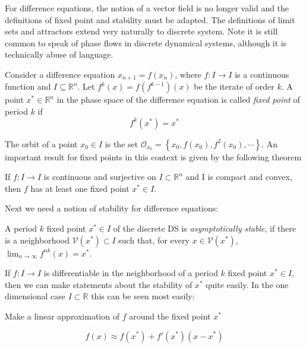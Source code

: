 For difference equations, the notion of a vector field is no longer valid and the definitions of fixed point and stability must be adapted. The definitions of
limit sets and attractors extend very naturally to discrete system.
Note it is still common to speak of phase flows in discrete dynamical systems, although it is technically abuse of language.

\begin{definition}
    Consider a difference equation $x_{n+1} = f(x_n)$, where $f: I \rightarrow I$ is a continuous function and $I \subseteq \mathbb{R}^n$.
    Let $f^k(x) = f(f^{k-1})(x)$ be the iterate of order $k$. A point $x^{\ast}\in \mathbb{R}^n$ in the phase space of the difference equation 
    is called \textit{fixed point} of period $k$ if 
    \begin{equation}
        f^k(x^{\ast}) = x^{\ast}
        \label{eq:dicr_fp}
    \end{equation}
\end{definition}

The orbit of a point $x_0 \in I$ is the set $\mathscr{O}_{x_0} = \left\{x_0, f(x_0), f^2(x_0), \cdots \right\}$. An important result for fixed points in this context is 
given by the following theorem

\begin{theorem}
If $f:I \rightarrow I$ is continuous and surjective on $I \subset \mathbb{R}^n$ and I is compact and convex, then $f$ has at least one fixed point $x^{\ast} \in I$.
\end{theorem}

Next we need a notion of stability for difference equations: 

\begin{definition}
    A period $k$ fixed point $x^{\ast} \in I$ of the discrete DS is \textit{asymptotically stable}, if there is a neighborhood $\mathcal{V}(x^{\ast}) \subset I$ such that,
    for every $x \in \mathcal{V}(x^{\ast})$, $\lim_{n\rightarrow \infty}f^{nk}(x) = x^{\ast}$.
\end{definition}

If $f: I \rightarrow I$ is differentiable in the neighborhood of a period $k$ fixed point $x^{\ast} \in I$, then we can make statements about the stability of $x^{\ast}$
quite easily. In the one dimensional case $I \subset \mathbb{R}$ this can be seen most easily:

Make a linear approximation of $f$ around the fixed point $x^{\ast}$

\begin{equation}
    f(x) \approx f(x^{\ast}) + f'(x^{\ast}) (x - x^{\ast})
\end{equation}

